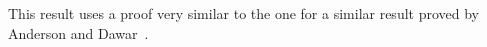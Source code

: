 \documentclass[../paper.tex]{subfiles}
\begin{document}


This result uses a proof very similar to the one for a similar result proved by
Anderson and Dawar~\cite{AndersonD17}.
\end{document}

